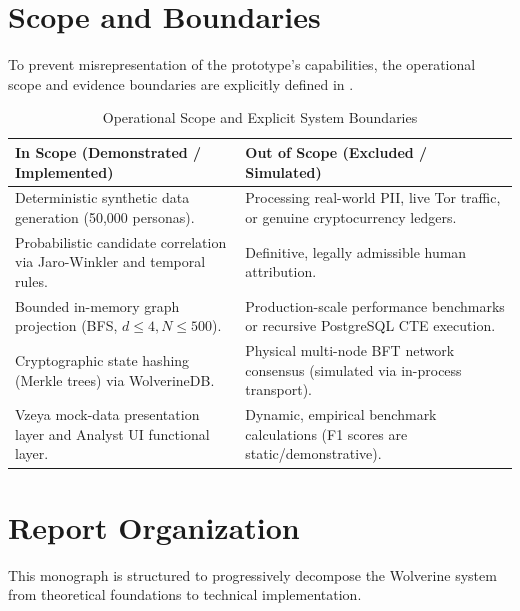 \section{Scope and Boundaries}
\label{sec:intro-scope}
To prevent misrepresentation of the prototype's capabilities, the operational scope and evidence boundaries are explicitly defined in .

\begin{table}[h]
\centering
\begin{tabular}{p{} | p{}}
\toprule
\textbf{In Scope (Demonstrated / Implemented)} & \textbf{Out of Scope (Excluded / Simulated)} \\
\midrule
Deterministic synthetic data generation (50,000 personas). & Processing real-world PII, live Tor traffic, or genuine cryptocurrency ledgers. \\
\addlinespace
Probabilistic candidate correlation via Jaro-Winkler and temporal rules. & Definitive, legally admissible human attribution. \\
\addlinespace
Bounded in-memory graph projection (BFS, $d \le 4, N \le 500$). & Production-scale performance benchmarks or recursive PostgreSQL CTE execution. \\
\addlinespace
Cryptographic state hashing (Merkle trees) via WolverineDB. & Physical multi-node BFT network consensus (simulated via in-process transport). \\
\addlinespace
Vzeya mock-data presentation layer and Analyst UI functional layer. & Dynamic, empirical benchmark calculations (F1 scores are static/demonstrative). \\
\bottomrule
\end{tabular}
\caption{Operational Scope and Explicit System Boundaries}
\label{tab:scope-boundaries}
\end{table}

\section{Report Organization}
\label{sec:intro-organization}
This monograph is structured to progressively decompose the Wolverine system from theoretical foundations to technical implementation. 

